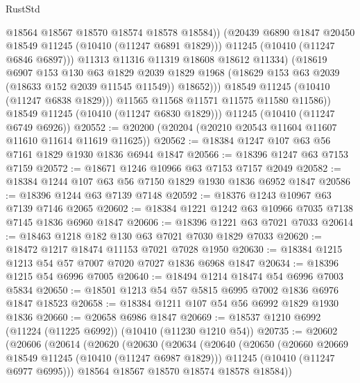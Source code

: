 \begin{lexlean}{RustStd}
\begin{coremodule}
                        @18564
                        @18567
                        @18570
                        @18574
                        @18578
                        @18584))
                    (@20439 @6890 @1847 @20450 @18549 @11245 (@10410 (@11247 @6891 @1829)))
                    @11245
                    (@10410 (@11247 @6846 @6897)))
                  @11313
                  @11316
                  @11319
                  @18608
                  @18612
                  @11334)
                (@18619
                  @6907
                  @153
                  @130
                  @63
                  @1829
                  @2039
                  @1829
                  @1968
                  (@18629 @153 @63 @2039 (@18633 @152 @2039 @11545 @11549))
                  @18652)))
            @18549
            @11245
            (@10410 (@11247 @6838 @1829)))
          @11565
          @11568
          @11571
          @11575
          @11580
          @11586))
      @18549
      @11245
      (@10410 (@11247 @6830 @1829)))
    @11245
    (@10410 (@11247 @6749 @6926))
@20552 := @20200 (@20204 (@20210 @20543 @11604 @11607 @11610 @11614 @11619 @11625))
@20562 := @18384 @1247 @107 @63 @56 @7161 @1829 @1930 @1836 @6944 @1847
@20566 := @18396 @1247 @63 @7153 @7159
@20572 := @18671 @1246 @10966 @63 @7153 @7157 @2049
@20582 := @18384 @1244 @107 @63 @56 @7150 @1829 @1930 @1836 @6952 @1847
@20586 := @18396 @1244 @63 @7139 @7148
@20592 := @18376 @1243 @10967 @63 @7139 @7146 @2065
@20602 := @18384 @1221 @1242 @63 @10966 @7035 @7138 @7145 @1836 @6960 @1847
@20606 := @18396 @1221 @63 @7021 @7033
@20614 := @18463 @1218 @182 @130 @63 @7021 @7030 @1829 @7033
@20620 := @18472 @1217 @18474 @11153 @7021 @7028 @1950
@20630 := @18384 @1215 @1213 @54 @57 @7007 @7020 @7027 @1836 @6968 @1847
@20634 := @18396 @1215 @54 @6996 @7005
@20640 := @18494 @1214 @18474 @54 @6996 @7003 @5834
@20650 := @18501 @1213 @54 @57 @5815 @6995 @7002 @1836 @6976 @1847 @18523
@20658 := @18384 @1211 @107 @54 @56 @6992 @1829 @1930 @1836
@20660 := @20658 @6986 @1847
@20669 := @18537 @1210 @6992 (@11224 (@11225 @6992)) (@10410 (@11230 @1210 @54))
@20735 := @20602
    (@20606
      (@20614
        (@20620
          (@20630
            (@20634
              (@20640
                (@20650
                  (@20660 @20669 @18549 @11245 (@10410 (@11247 @6987 @1829)))
                  @11245
                  (@10410 (@11247 @6977 @6995)))
                @18564
                @18567
                @18570
                @18574
                @18578
                @18584))

\end{coremodule}
\end{lexlean}

